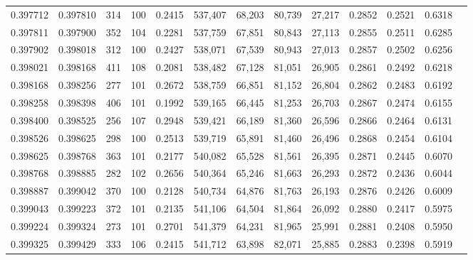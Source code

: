 \begin{tabular}{rrrrrrrrrrrrr}
0.397712 & 0.397810 &   314 & 100 &                                     0.2415 & 537,407 &  68,203 &  80,739 &  27,217 & 0.2852 & 0.2521 & 0.6318 \\
0.397811 & 0.397900 &   352 & 104 &                                     0.2281 & 537,759 &  67,851 &  80,843 &  27,113 & 0.2855 & 0.2511 & 0.6285 \\
0.397902 & 0.398018 &   312 & 100 &                                     0.2427 & 538,071 &  67,539 &  80,943 &  27,013 & 0.2857 & 0.2502 & 0.6256 \\
0.398021 & 0.398168 &   411 & 108 &                                     0.2081 & 538,482 &  67,128 &  81,051 &  26,905 & 0.2861 & 0.2492 & 0.6218 \\
0.398168 & 0.398256 &   277 & 101 &                                     0.2672 & 538,759 &  66,851 &  81,152 &  26,804 & 0.2862 & 0.2483 & 0.6192 \\
0.398258 & 0.398398 &   406 & 101 &                                     0.1992 & 539,165 &  66,445 &  81,253 &  26,703 & 0.2867 & 0.2474 & 0.6155 \\
0.398400 & 0.398525 &   256 & 107 &                                     0.2948 & 539,421 &  66,189 &  81,360 &  26,596 & 0.2866 & 0.2464 & 0.6131 \\
0.398526 & 0.398625 &   298 & 100 &                                     0.2513 & 539,719 &  65,891 &  81,460 &  26,496 & 0.2868 & 0.2454 & 0.6104 \\
0.398625 & 0.398768 &   363 & 101 &                                     0.2177 & 540,082 &  65,528 &  81,561 &  26,395 & 0.2871 & 0.2445 & 0.6070 \\
0.398768 & 0.398885 &   282 & 102 &                                     0.2656 & 540,364 &  65,246 &  81,663 &  26,293 & 0.2872 & 0.2436 & 0.6044 \\
0.398887 & 0.399042 &   370 & 100 &                                     0.2128 & 540,734 &  64,876 &  81,763 &  26,193 & 0.2876 & 0.2426 & 0.6009 \\
0.399043 & 0.399223 &   372 & 101 &                                     0.2135 & 541,106 &  64,504 &  81,864 &  26,092 & 0.2880 & 0.2417 & 0.5975 \\
0.399224 & 0.399324 &   273 & 101 &                                     0.2701 & 541,379 &  64,231 &  81,965 &  25,991 & 0.2881 & 0.2408 & 0.5950 \\
0.399325 & 0.399429 &   333 & 106 &                                     0.2415 & 541,712 &  63,898 &  82,071 &  25,885 & 0.2883 & 0.2398 & 0.5919 \\

\end{tabular}
